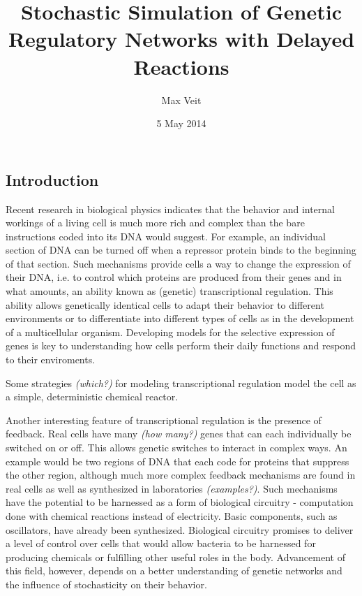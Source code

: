 \documentclass[english,letterpaper,12pt]{article}
\begin{document}
\title{Stochastic Simulation of Genetic Regulatory Networks with Delayed Reactions}
\author{Max Veit}
\date{5 May 2014}

\maketitle

\begin{doublespacing}

\section{Introduction} %
\label{sec:introduction}

Recent research in biological physics \cite{ecoli-decision} indicates that the behavior and internal workings of a living cell is much more rich and complex than the bare instructions coded into its DNA would suggest. For example, an individual section of DNA can be turned off when a repressor protein binds to the beginning of that section. Such mechanisms provide cells a way to change the expression of their DNA, i.e. to control which proteins are produced from their genes and in what amounts, an ability known as (genetic) transcriptional regulation. This ability allows genetically identical cells to adapt their behavior to different environments or to differentiate into different types of cells as in the development of a multicellular organism. Developing models for the selective expression of genes is key to understanding how cells perform their daily functions and respond to their enviroments.

Some strategies \textit{(which?)} for modeling transcriptional regulation model the cell as a simple, deterministic chemical reactor. 

Another interesting feature of transcriptional regulation is the presence of feedback. Real cells have many \textit{(how many?)} genes that can each individually be switched on or off. This allows genetic switches to interact in complex ways. An example would be two regions of DNA that each code for proteins that suppress the other region, although much more complex feedback mechanisms are found in real cells as well as synthesized in laboratories \textit{(examples?)}. Such mechanisms have the potential to be harnessed as a form of biological circuitry - computation done with chemical reactions instead of electricity. Basic components, such as oscillators, have already been synthesized. Biological circuitry promises to deliver a level of control over cells that would allow bacteria to be harnessed for producing chemicals or fulfilling other useful roles in the body. Advancement of this field, however, depends on a better understanding of genetic networks and the influence of stochasticity on their behavior.


\end{doublespacing}
\end{document}

